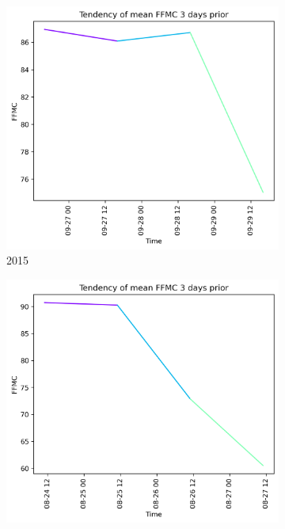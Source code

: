 \begin{figure}[h]
	\centering
	\caption{FFMC values 3 days prior to wildfire}
	\begin{subfigure}{0.3\textwidth}
		\centering
		\includegraphics[width=\textwidth]{graphs/3days/2015_3daysprior_tendency_graph_FFMC.png}
		\caption{2015}
		\label{fig:ffmc_prior_3_days_2015}
	\end{subfigure}
	\hfill
	\begin{subfigure}{0.3\textwidth}
		\centering
		\includegraphics[width=\textwidth]{graphs/3days/2019_3daysprior_tendency_graph_FFMC.png}

\end{subfigure}
\end{figure}
